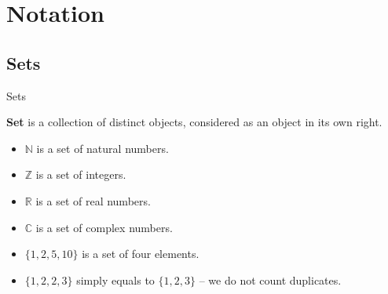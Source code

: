 \documentclass{beamer}
\begin{document}
    \section{Notation}

    \subsection{Sets}

    \begin{frame}{Sets}
      \begin{definition}
        \textbf{Set} is a collection of distinct objects, considered as an object in its own right.
      \end{definition}

      \begin{example}
        \begin{itemize}
          \item $\mathbb{N}$ is a set of natural numbers.
          \item $\mathbb{Z}$ is a set of integers.
          \item $\mathbb{R}$ is a set of real numbers.
          \item $\mathbb{C}$ is a set of complex numbers.
          \item $\{1, 2, 5, 10\}$ is a set of four elements.
          \item $\{1, 2, 2, 3\}$ simply equals to $\{1,2,3\}$ -- we do not count duplicates.
        \end{itemize}
      \end{example}
    \end{frame}
\end{document}
